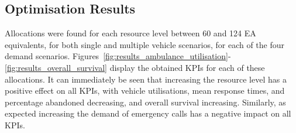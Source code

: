 \documentclass[preprint,12pt]{elsarticle}
\begin{document}



\subsection{Optimisation Results}\label{sec:optimisation_results}
Allocations were found for each resource level between 60 and 124 EA equivalents, for both single and multiple vehicle scenarios, for each of the four demand scenarios. Figures~\ref{fig:results_ambulance_utilisation}-\ref{fig:results_overall_survival} display the obtained KPIs for each of these allocations. It can immediately be seen that increasing the resource level has a positive effect on all KPIs, with vehicle utilisations, mean response times, and percentage abandoned decreasing, and overall survival increasing. Similarly, as expected increasing the demand of emergency calls has a negative impact on all KPIs.
\end{document}
